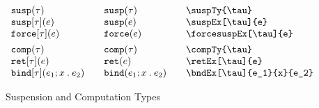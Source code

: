 \documentclass[11pt]{article}
\begin{document}
\begin{figure}
  
  \begin{small}
    \begin{displaymath}
      \begin{array}{l@{\qquad}l@{\qquad}l@{\qquad}l}
        \suspTy{\tau}           & \suspTy*{\tau}           & \verb|\suspTy{\tau}|           \\
        \suspEx[\tau]{e}        & \suspEx*[\tau]{e}        & \verb|\suspEx[\tau]{e}|        \\
        \forcesuspEx[\tau]{e}   & \forcesuspEx*[\tau]{e}   & \verb|\forcesuspEx[\tau]{e}|   \\[1ex]

        \compTy{\tau}           & \compTy*{\tau}           & \verb|\compTy{\tau}|           \\
        \retEx[\tau]{e}         & \retEx*[\tau]{e}         & \verb|\retEx[\tau]{e}|         \\
        \bndEx[\tau]{e_1}{x}{e_2} & \bndEx*[\tau]{e_1}{x}{e_2} & \verb|\bndEx[\tau]{e_1}{x}{e_2}|
    \end{array}
    \end{displaymath}
  \end{small}

  \caption{Suspension and Computation Types}
  \label{fig:comp-susp}
\end{figure}
\end{document}
